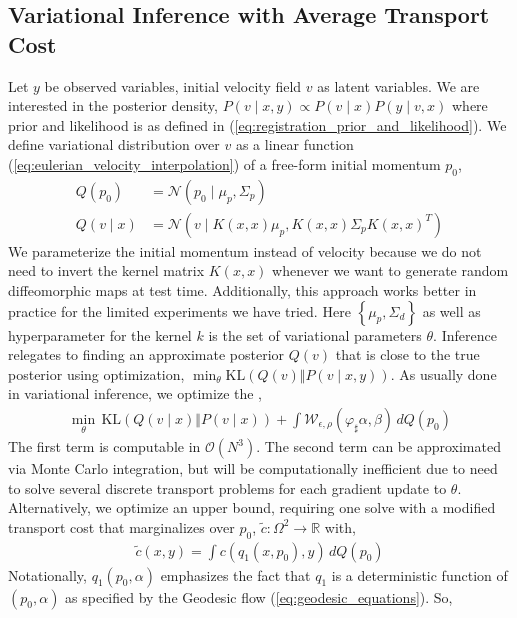 \documentclass{6838publ}
\newcommand\sN{\ensuremath{\mathcal{N}}}
\newcommand\sO{\ensuremath{\mathcal{O}}}
\newcommand\sW{\ensuremath{\mathcal{W}}}
\newcommand\R{\ensuremath{\mathbb{R}}} %
\newcommand\pc[1]{\ensuremath{\left\{ #1 \right\}}} %
\begin{document}
\subsection{Variational Inference with Average Transport Cost}

Let $y$ be observed variables, initial velocity field $v$ as latent variables. We are interested in the posterior density, $P(v\mid x, y) \propto P(v\mid x) P(y\mid v,x)$ where prior and likelihood is as defined in (\ref{eq:registration_prior_and_likelihood}). We define variational distribution over $v$ as a linear function (\ref{eq:eulerian_velocity_interpolation}) of a free-form initial momentum $p_0$,
\begin{align}
    Q(p_0)
        &= \sN(p_0\mid \mu_p, \Sigma_p) \\
    Q(v\mid x)
        &= \sN(v\mid K(x,x)\mu_p, K(x,x) \Sigma_p K(x,x)^T)
\end{align}
We parameterize the initial momentum instead of velocity because we do not need to invert the kernel matrix $K(x,x)$ whenever we want to generate random diffeomorphic maps at test time. Additionally, this approach works better in practice for the limited experiments we have tried. Here $\pc{\mu_p, \Sigma_d}$ as well as hyperparameter for the kernel $k$ is the set of variational parameters $\theta$. Inference relegates to finding an approximate posterior $Q(v)$ that is close to the true posterior using optimization, $\min_{\theta} \text{KL}(Q(v)\Vert P(v\mid x, y))$. As usually done in variational inference, we optimize the ,
\begin{align}
    \min_{\theta}\,
        \text{KL}(Q(v\mid x)\Vert P(v\mid x)) + \int \sW_{\epsilon,\rho}(\varphi_\sharp\alpha,\beta) \, dQ(p_0)
    \label{eq:opt_elbo1}
\end{align}
The first term is computable in $\sO(N^3)$. The second term can be approximated via Monte Carlo integration, but will be computationally inefficient due to need to solve several discrete transport problems for each gradient update to $\theta$. Alternatively, we optimize an upper bound, requiring one solve with a modified transport cost that marginalizes over $p_0$, $\widetilde{c}: \Omega^2\to\R$ with,
\begin{align}
    \widetilde{c}(x,y)
        = \int c(q_1(x,p_0),y)\, dQ(p_0)
    \label{eq:cost_marginalize_momentum}
\end{align}
Notationally, $q_1(p_0,\alpha)$ emphasizes the fact that $q_1$ is a deterministic function of $(p_0,\alpha)$ as specified by the Geodesic flow (\ref{eq:geodesic_equations}). So,
\end{document}
